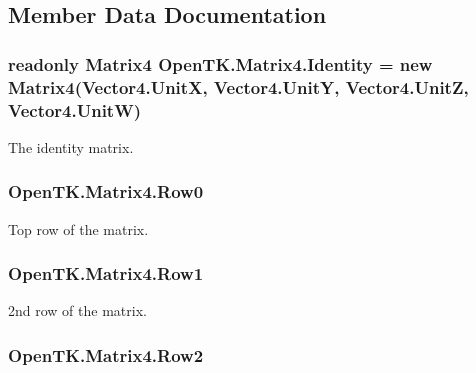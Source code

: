\subsection{Member Data Documentation}
\hypertarget{struct_open_t_k_1_1_matrix4_a6f7b2f68ab7b7bce17ef850f6b2be3fb}{
\subsubsection[{Identity}]{\setlength{\rightskip}{0pt plus 5cm}readonly {\bf Matrix4} Open\-T\-K.\-Matrix4.\-Identity = new {\bf Matrix4}({\bf Vector4.\-Unit\-X}, {\bf Vector4.\-Unit\-Y}, {\bf Vector4.\-Unit\-Z}, {\bf Vector4.\-Unit\-W})\hspace{0.3cm}{\ttfamily [static]}}}\label{struct_open_t_k_1_1_matrix4_a6f7b2f68ab7b7bce17ef850f6b2be3fb}


The identity matrix. 

\hypertarget{struct_open_t_k_1_1_matrix4_a3fd8b28b615b179bcc0e4fde42113b1d}{
\subsubsection[{Row0}]{ Open\-T\-K.\-Matrix4.\-Row0}}\label{struct_open_t_k_1_1_matrix4_a3fd8b28b615b179bcc0e4fde42113b1d}


Top row of the matrix. 

\hypertarget{struct_open_t_k_1_1_matrix4_a41a0aa349da51a65d6cf730c8045752e}{
\subsubsection[{Row1}]{ Open\-T\-K.\-Matrix4.\-Row1}}\label{struct_open_t_k_1_1_matrix4_a41a0aa349da51a65d6cf730c8045752e}


2nd row of the matrix. 

\hypertarget{struct_open_t_k_1_1_matrix4_a8efc78c75943f100dc9381de44c451d9}{
\subsubsection[{Row2}]{ Open\-T\-K.\-Matrix4.\-Row2}}\label{struct_open_t_k_1_1_matrix4_a8efc78c75943f100dc9381de44c451d9}


